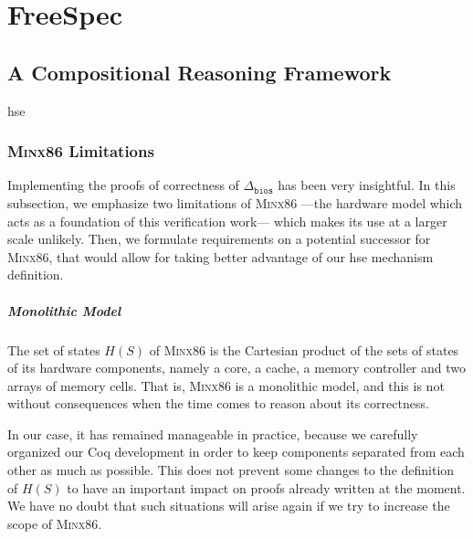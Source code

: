 \documentclass[oneside,a4paper]{memoir}
\theoremstyle{break}
\begin{document}
\chapter{FreeSpec}

\section{A Compositional Reasoning Framework}

\ac{hse}

\subsection{{\scshape Minx86} Limitations}

Implementing the proofs of correctness of \( \Delta_{\mathtt{bios}} \) has been
very insightful.
%
In this subsection, we emphasize two limitations of {\scshape Minx86} ---the
hardware model which acts as a foundation of this verification work--- which
makes its use at a larger scale unlikely.
%
Then, we formulate requirements on a potential successor for {\scshape Minx86},
that would allow for taking better advantage of our \ac{hse} mechanism
definition.

\paragraph{Monolithic Model}
%
The set of states \( H(S) \) of {\scshape Minx86} is the Cartesian product of
the sets of states of its hardware components, namely a core, a cache, a memory
controller and two arrays of memory cells.
%
That is, {\scshape Minx86} is a monolithic model, and this is not without
consequences when the time comes to reason about its correctness.

In our case, it has remained manageable in practice, because we carefully
organized our Coq development in order to keep components separated from each
other as much as possible.
%
This does not prevent some changes to the definition of \( H(S) \) to have an
important impact on proofs already written at the moment.
%
We have no doubt that such situations will arise again if we try to increase the
scope of {\scshape Minx86}.
\end{document}
